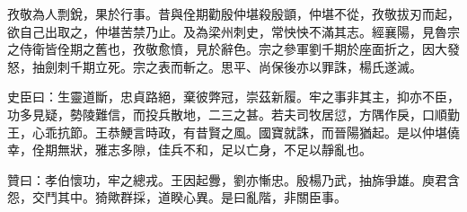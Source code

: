 \begin{pinyinscope}
 孜敬為人剽銳，果於行事。昔與佺期勸殷仲堪殺殷顗，仲堪不從，孜敬拔刃而起，欲自己出取之，仲堪苦禁乃止。及為梁州刺史，常怏怏不滿其志。經襄陽，見魯宗之侍衛皆佺期之舊也，孜敬愈憤，見於辭色。宗之參軍劉千期於座面折之，因大發怒，抽劍刺千期立死。宗之表而斬之。思平、尚保後亦以罪誅，楊氏遂滅。



 史臣曰：生靈道斷，忠貞路絕，棄彼弊冠，崇茲新履。牢之事非其主，抑亦不臣，功多見疑，勢陵難信，而投兵散地，二三之甚。若夫司牧居愆，方隅作戾，口順勤王，心乖抗節。王恭鯁言時政，有昔賢之風。國寶就誅，而晉陽猶起。是以仲堪僥幸，佺期無狀，雅志多隙，佳兵不和，足以亡身，不足以靜亂也。



 贊曰：孝伯懷功，牢之總戎。王因起釁，劉亦慚忠。殷楊乃武，抽旆爭雄。庾君含怨，交鬥其中。猗歟群採，道睽心異。是曰亂階，非關臣事。



\end{pinyinscope}